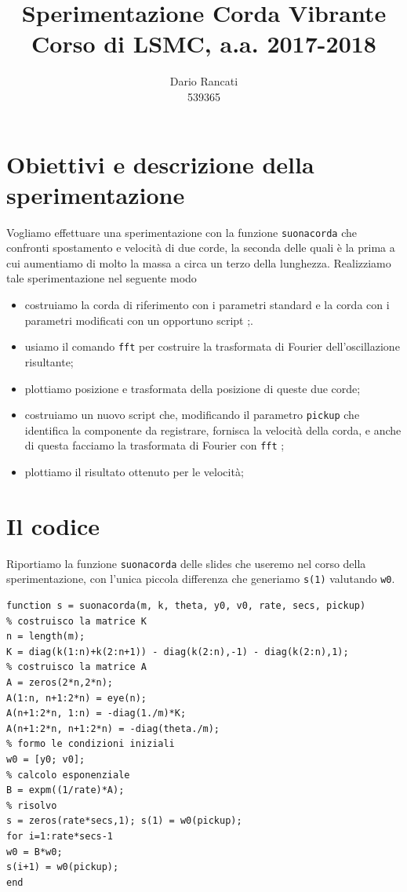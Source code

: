 \documentclass{article}
\title{Sperimentazione Corda Vibrante\\
Corso di LSMC, a.a. 2017-2018}
\author{Dario Rancati\\
        539365}
\begin{document}
\maketitle

\section{Obiettivi e descrizione della sperimentazione}
 
Vogliamo effettuare una sperimentazione con la funzione \texttt{suonacorda} che confronti spostamento e velocità di due corde, la seconda delle quali è la prima a cui aumentiamo di molto la massa a circa un terzo della lunghezza. Realizziamo tale sperimentazione nel seguente modo
 \begin{itemize}
 \item costruiamo la corda di riferimento con i parametri standard e la corda con i parametri modificati con un opportuno script ;.
 \item usiamo il comando \texttt{fft} per costruire la trasformata di Fourier dell'oscillazione risultante;
 \item plottiamo posizione e trasformata della posizione di queste due corde;
 \item costruiamo un nuovo script che, modificando il parametro \texttt{pickup} che identifica la componente da registrare, fornisca la velocità della corda, e anche di questa facciamo la trasformata di Fourier con \texttt{fft} ; 
\item plottiamo il risultato ottenuto per le velocità;
 \end{itemize}

\section{Il codice}

Riportiamo la funzione \texttt{suonacorda} delle slides che useremo nel corso della sperimentazione, con l'unica piccola differenza che generiamo \texttt{s(1)} valutando \texttt{w0}.

\begin{lstlisting}
function s = suonacorda(m, k, theta, y0, v0, rate, secs, pickup)
% costruisco la matrice K
n = length(m);
K = diag(k(1:n)+k(2:n+1)) - diag(k(2:n),-1) - diag(k(2:n),1);
% costruisco la matrice A
A = zeros(2*n,2*n);
A(1:n, n+1:2*n) = eye(n);
A(n+1:2*n, 1:n) = -diag(1./m)*K;
A(n+1:2*n, n+1:2*n) = -diag(theta./m);
% formo le condizioni iniziali
w0 = [y0; v0];
% calcolo esponenziale
B = expm((1/rate)*A);
% risolvo
s = zeros(rate*secs,1); s(1) = w0(pickup);
for i=1:rate*secs-1
w0 = B*w0;
s(i+1) = w0(pickup);
end
\end{lstlisting}
\end{document}
